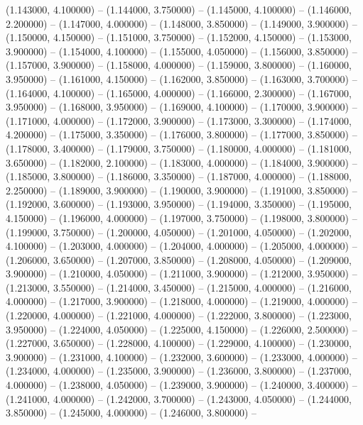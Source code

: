 (1.143000, 4.100000) -- 
(1.144000, 3.750000) -- 
(1.145000, 4.100000) -- 
(1.146000, 2.200000) -- 
(1.147000, 4.000000) -- 
(1.148000, 3.850000) -- 
(1.149000, 3.900000) -- 
(1.150000, 4.150000) -- 
(1.151000, 3.750000) -- 
(1.152000, 4.150000) -- 
(1.153000, 3.900000) -- 
(1.154000, 4.100000) -- 
(1.155000, 4.050000) -- 
(1.156000, 3.850000) -- 
(1.157000, 3.900000) -- 
(1.158000, 4.000000) -- 
(1.159000, 3.800000) -- 
(1.160000, 3.950000) -- 
(1.161000, 4.150000) -- 
(1.162000, 3.850000) -- 
(1.163000, 3.700000) -- 
(1.164000, 4.100000) -- 
(1.165000, 4.000000) -- 
(1.166000, 2.300000) -- 
(1.167000, 3.950000) -- 
(1.168000, 3.950000) -- 
(1.169000, 4.100000) -- 
(1.170000, 3.900000) -- 
(1.171000, 4.000000) -- 
(1.172000, 3.900000) -- 
(1.173000, 3.300000) -- 
(1.174000, 4.200000) -- 
(1.175000, 3.350000) -- 
(1.176000, 3.800000) -- 
(1.177000, 3.850000) -- 
(1.178000, 3.400000) -- 
(1.179000, 3.750000) -- 
(1.180000, 4.000000) -- 
(1.181000, 3.650000) -- 
(1.182000, 2.100000) -- 
(1.183000, 4.000000) -- 
(1.184000, 3.900000) -- 
(1.185000, 3.800000) -- 
(1.186000, 3.350000) -- 
(1.187000, 4.000000) -- 
(1.188000, 2.250000) -- 
(1.189000, 3.900000) -- 
(1.190000, 3.900000) -- 
(1.191000, 3.850000) -- 
(1.192000, 3.600000) -- 
(1.193000, 3.950000) -- 
(1.194000, 3.350000) -- 
(1.195000, 4.150000) -- 
(1.196000, 4.000000) -- 
(1.197000, 3.750000) -- 
(1.198000, 3.800000) -- 
(1.199000, 3.750000) -- 
(1.200000, 4.050000) -- 
(1.201000, 4.050000) -- 
(1.202000, 4.100000) -- 
(1.203000, 4.000000) -- 
(1.204000, 4.000000) -- 
(1.205000, 4.000000) -- 
(1.206000, 3.650000) -- 
(1.207000, 3.850000) -- 
(1.208000, 4.050000) -- 
(1.209000, 3.900000) -- 
(1.210000, 4.050000) -- 
(1.211000, 3.900000) -- 
(1.212000, 3.950000) -- 
(1.213000, 3.550000) -- 
(1.214000, 3.450000) -- 
(1.215000, 4.000000) -- 
(1.216000, 4.000000) -- 
(1.217000, 3.900000) -- 
(1.218000, 4.000000) -- 
(1.219000, 4.000000) -- 
(1.220000, 4.000000) -- 
(1.221000, 4.000000) -- 
(1.222000, 3.800000) -- 
(1.223000, 3.950000) -- 
(1.224000, 4.050000) -- 
(1.225000, 4.150000) -- 
(1.226000, 2.500000) -- 
(1.227000, 3.650000) -- 
(1.228000, 4.100000) -- 
(1.229000, 4.100000) -- 
(1.230000, 3.900000) -- 
(1.231000, 4.100000) -- 
(1.232000, 3.600000) -- 
(1.233000, 4.000000) -- 
(1.234000, 4.000000) -- 
(1.235000, 3.900000) -- 
(1.236000, 3.800000) -- 
(1.237000, 4.000000) -- 
(1.238000, 4.050000) -- 
(1.239000, 3.900000) -- 
(1.240000, 3.400000) -- 
(1.241000, 4.000000) -- 
(1.242000, 3.700000) -- 
(1.243000, 4.050000) -- 
(1.244000, 3.850000) -- 
(1.245000, 4.000000) -- 
(1.246000, 3.800000) -- 
